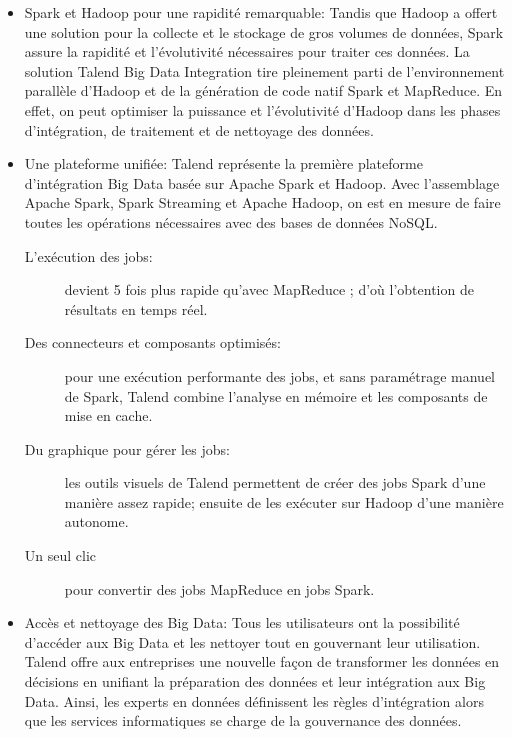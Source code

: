 \documentclass[12pt,a4wide,twoside]{report}
\begin{document}
\begin{itemize}
		\item Spark et Hadoop pour une rapidité remarquable: \newline
		Tandis que Hadoop a offert une solution pour la collecte et le stockage de gros volumes de données, Spark assure la rapidité et l'évolutivité nécessaires pour traiter ces données. \newline
		La solution Talend Big Data Integration tire pleinement parti de l'environnement parallèle d'Hadoop et de la génération de code natif Spark et MapReduce. En effet, on peut optimiser la puissance et l'évolutivité  d'Hadoop dans les phases d'intégration, de traitement et de nettoyage des données. \newline
		
		\item Une plateforme unifiée:
		Talend représente la première plateforme d'intégration Big Data basée sur Apache Spark et Hadoop. Avec l'assemblage Apache Spark, Spark Streaming et Apache Hadoop, on est en mesure de faire toutes les opérations nécessaires avec des bases de données NoSQL.
		
		\begin{description}
				\item[L'exécution des jobs:] devient 5 fois plus rapide qu'avec MapReduce \cite{misc7}; d'où l'obtention de résultats en temps réel.
				
				\item[Des connecteurs et composants optimisés:] pour une exécution performante des jobs, et sans paramétrage manuel de Spark, Talend combine l'analyse en mémoire et les composants de mise en cache. 
				
				\item[Du graphique pour gérer les jobs:] les outils visuels de Talend permettent de créer des jobs Spark d'une manière assez rapide; ensuite de les exécuter sur Hadoop d'une manière autonome.
				
				\item[Un seul clic] pour convertir des jobs MapReduce en jobs Spark.
		\end{description}	
		
		\item Accès et nettoyage des Big Data: \newline
		Tous les utilisateurs ont la possibilité d'accéder aux Big Data et les nettoyer tout en gouvernant leur utilisation. Talend offre aux entreprises une nouvelle façon de transformer les données en décisions en unifiant la préparation des données et leur intégration aux Big Data. Ainsi, les experts en données définissent les règles d'intégration alors que les services informatiques se charge de la gouvernance des données. \newline
		

\end{itemize}
\end{document}
